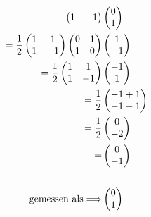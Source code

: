 \begin{align}
\begin{pmatrix}
        1 & -1
    \end{pmatrix}
    &\begin{pmatrix}
        0 \\
        1
    \end{pmatrix} \\
    =
    \frac{1}{2}
    \begin{pmatrix}
        1 & 1 \\
        1 & -1
    \end{pmatrix}
    \begin{pmatrix}
        0 & 1 \\
        1 & 0
    \end{pmatrix} 
    &\begin{pmatrix}
        1 \\
        -1
    \end{pmatrix} \\
    =
    \frac{1}{2}
    \begin{pmatrix}
        1 & 1 \\
        1 & -1
    \end{pmatrix}
    &\begin{pmatrix}
        -1 \\
        1
    \end{pmatrix} \\
    =
    \frac{1}{2}
    &\begin{pmatrix}
        -1 +1 \\
        -1 -1
    \end{pmatrix} \\
    =
    \frac{1}{2}
    &\begin{pmatrix}
        0 \\
        -2
    \end{pmatrix} \\
    =
    &\begin{pmatrix}
        0 \\
        -1
    \end{pmatrix} \\
    \notag \\
    \text{gemessen als} \Longrightarrow 
    &\begin{pmatrix}
        0 \\
        1
    \end{pmatrix} 
\end{align}